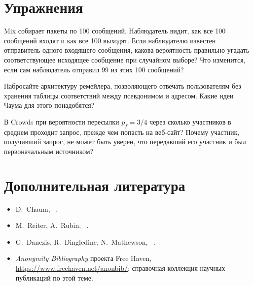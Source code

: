 \section*{Упражнения}

\begin{esercizio}[1]\label{es:02-mix}
Mix собирает пакеты по 100 сообщений. Наблюдатель видит, как все 100 сообщений входят и как все 100 выходят. Если наблюдателю известен отправитель одного входящего сообщения, какова вероятность правильно угадать соответствующее исходящее сообщение при случайном выборе? Что изменится, если сам наблюдатель отправил 99 из этих 100 сообщений?
\end{esercizio}

\begin{esercizio}[2]\label{es:02-penet}
Набросайте архитектуру ремейлера, позволяющего отвечать пользователям без хранения таблицы соответствий между псевдонимом и адресом. Какие идеи Чаума для этого понадобятся?
\end{esercizio}

\begin{esercizio}[2]\label{es:02-crowds}
В Crowds при вероятности пересылки $p_f = 3/4$ через сколько участников в среднем проходит запрос, прежде чем попасть на веб-сайт? Почему участник, получивший запрос, не может быть уверен, что передавший его участник и был первоначальным источником?
\end{esercizio}

\section*{Дополнительная литература}
\begin{itemize}
  \item D.~Chaum, ~\cite{chaum1981untraceable}.
  \item M.~Reiter, A.~Rubin, ~\cite{reiter1998crowds}.
  \item G.~Danezis, R.~Dingledine, N.~Mathewson, ~\cite{danezis2003mixminion}.
  \item \emph{Anonymity Bibliography} проекта Free Haven, \url{https://www.freehaven.net/anonbib/}: справочная коллекция научных публикаций по этой теме.
\end{itemize}
